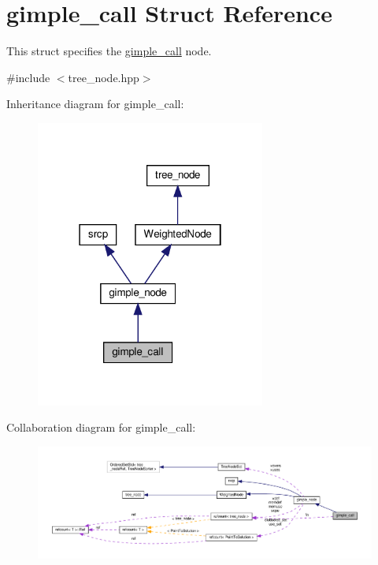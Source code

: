 \hypertarget{structgimple__call}{}\section{gimple\+\_\+call Struct Reference}
\label{structgimple__call}


This struct specifies the \hyperlink{structgimple__call}{gimple\+\_\+call} node.  




{\ttfamily \#include $<$tree\+\_\+node.\+hpp$>$}



Inheritance diagram for gimple\+\_\+call\+:
\nopagebreak
\begin{figure}[H]
\begin{center}
\leavevmode
\includegraphics[width=214pt]{d9/da0/structgimple__call__inherit__graph}
\end{center}
\end{figure}


Collaboration diagram for gimple\+\_\+call\+:
\nopagebreak
\begin{figure}[H]
\begin{center}
\leavevmode
\includegraphics[width=350pt]{da/d77/structgimple__call__coll__graph}
\end{center}
\end{figure}
